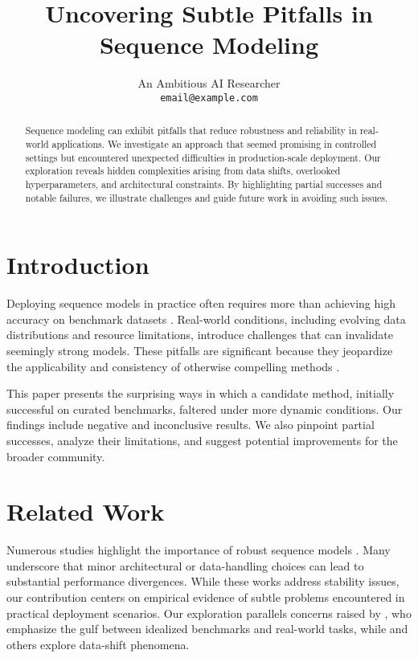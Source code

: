 \documentclass[11pt]{article}
\title{Uncovering Subtle Pitfalls in Sequence Modeling}
\author{
  An Ambitious AI Researcher \\
  \texttt{email@example.com}
}
\date{}
\begin{document}
\maketitle

\begin{abstract}
Sequence modeling can exhibit pitfalls that reduce robustness and reliability in real-world applications. We investigate an approach that seemed promising in controlled settings but encountered unexpected difficulties in production-scale deployment. Our exploration reveals hidden complexities arising from data shifts, overlooked hyperparameters, and architectural constraints. By highlighting partial successes and notable failures, we illustrate challenges and guide future work in avoiding such issues.
\end{abstract}

\section{Introduction}
Deploying sequence models in practice often requires more than achieving high accuracy on benchmark datasets \citep{smith2019example}. Real-world conditions, including evolving data distributions and resource limitations, introduce challenges that can invalidate seemingly strong models. These pitfalls are significant because they jeopardize the applicability and consistency of otherwise compelling methods \citep{johnson2020survey}.

This paper presents the surprising ways in which a candidate method, initially successful on curated benchmarks, faltered under more dynamic conditions. Our findings include negative and inconclusive results. We also pinpoint partial successes, analyze their limitations, and suggest potential improvements for the broader community.

\section{Related Work}
Numerous studies highlight the importance of robust sequence models \citep{li2021pitfalls, allen2022shifts}. Many underscore that minor architectural or data-handling choices can lead to substantial performance divergences. While these works address stability issues, our contribution centers on empirical evidence of subtle problems encountered in practical deployment scenarios. Our exploration parallels concerns raised by \cite{smith2019example}, who emphasize the gulf between idealized benchmarks and real-world tasks, while \cite{johnson2020survey} and others explore data-shift phenomena.
\end{document}

